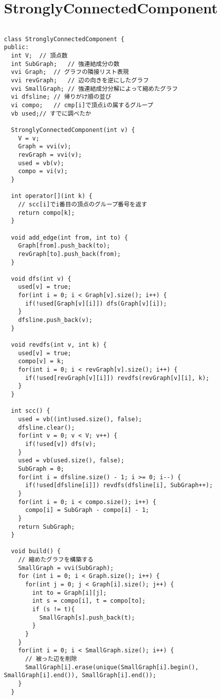 \documentclass[a4j,titlepage]{jarticle} %
\begin{document}
\color{white}
\section{StronglyConnectedComponent}
\color{black}
\begin{lstlisting}[caption=StronglyConnectedComponent]

class StronglyConnectedComponent {
public:
  int V;  // 頂点数
  int SubGraph;   // 強連結成分の数
  vvi Graph;  // グラフの隣接リスト表現
  vvi revGraph;   // 辺の向きを逆にしたグラフ
  vvi SmallGraph; // 強連結成分分解によって縮めたグラフ
  vi dfsline; // 帰りがけ順の並び
  vi compo;   // cmp[i]で頂点iの属するグループ
  vb used;// すでに調べたか

  StronglyConnectedComponent(int v) {
    V = v;
    Graph = vvi(v);
    revGraph = vvi(v);
    used = vb(v);
    compo = vi(v);
  }

  int operator[](int k) {
    // scc[i]でi番目の頂点のグループ番号を返す
    return compo[k];
  }

  void add_edge(int from, int to) {
    Graph[from].push_back(to);
    revGraph[to].push_back(from);
  }

  void dfs(int v) {
    used[v] = true;
    for(int i = 0; i < Graph[v].size(); i++) {
      if(!used[Graph[v][i]]) dfs(Graph[v][i]);
    }
    dfsline.push_back(v);
  }

  void revdfs(int v, int k) {
    used[v] = true;
    compo[v] = k;
    for(int i = 0; i < revGraph[v].size(); i++) {
      if(!used[revGraph[v][i]]) revdfs(revGraph[v][i], k);
    }
  }

  int scc() {
    used = vb((int)used.size(), false);
    dfsline.clear();
    for(int v = 0; v < V; v++) {
      if(!used[v]) dfs(v);
    }
    used = vb(used.size(), false);
    SubGraph = 0;
    for(int i = dfsline.size() - 1; i >= 0; i--) {
      if(!used[dfsline[i]]) revdfs(dfsline[i], SubGraph++);
    }
    for(int i = 0; i < compo.size(); i++) {
      compo[i] = SubGraph - compo[i] - 1;
    }
    return SubGraph;
  }

  void build() {
    // 縮めたグラフを構築する
    SmallGraph = vvi(SubGraph);
    for (int i = 0; i < Graph.size(); i++) {
      for(int j = 0; j < Graph[i].size(); j++) {
        int to = Graph[i][j];
        int s = compo[i], t = compo[to];
        if (s != t){
          SmallGraph[s].push_back(t);
        }
      }
    }
    for(int i = 0; i < SmallGraph.size(); i++) {
      // 被った辺を削除
      SmallGraph[i].erase(unique(SmallGraph[i].begin(), SmallGraph[i].end()), SmallGraph[i].end());
    }
  }


\end{lstlisting}
\end{document}
